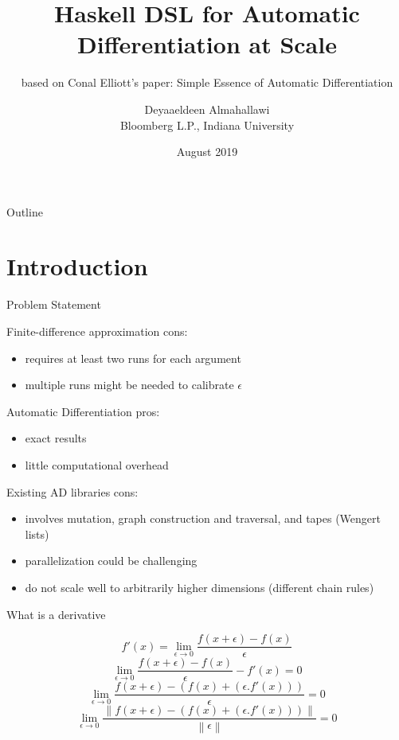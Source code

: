 \documentclass[12pt]{beamer}
\title{Haskell DSL for Automatic Differentiation at Scale}
\subtitle{based on Conal Elliott's paper: Simple Essence of Automatic Differentiation}
\author{Deyaaeldeen Almahallawi\\
  Bloomberg L.P., Indiana University}
\date{August 2019}
\begin{document}
\begin{frame}
\maketitle
\end{frame}

\begin{frame}{Outline}
\tableofcontents
\end{frame}

\section{Introduction}

\begin{frame}{Problem Statement}

Finite-difference approximation cons:
\begin{itemize}
\item requires at least two runs for each argument
\item multiple runs might be needed to calibrate $\epsilon$
\end{itemize}
\pause
Automatic Differentiation pros:
\begin{itemize}
\item exact results
\item little computational overhead
\end{itemize}
\pause
Existing AD libraries cons:
\begin{itemize}
\item involves mutation, graph construction and traversal, and tapes
  (Wengert lists)
\item parallelization could be challenging
\item do not scale well to arbitrarily higher dimensions (different
  chain rules)
\end{itemize}
\end{frame}

\begin{frame}{What is a derivative}

\begin{equation*}
  f'(x)=\lim_{\epsilon \to 0} \frac{f(x+\epsilon) - f(x)}{\epsilon}
\end{equation*}
\pause
\begin{equation*}
  \lim_{\epsilon \to 0} \frac{f(x+\epsilon) - f(x)}{\epsilon}-f'(x)=0
\end{equation*}
\pause
\begin{equation*}
  \lim_{\epsilon \to 0} \frac{f(x+\epsilon) - (f(x) + (\epsilon . f'(x)))}{\epsilon}=0
\end{equation*}
\pause
\begin{equation*}
  \lim_{\epsilon \to 0} \frac{\left\|f(x+\epsilon) - (f(x) + (\epsilon . f'(x)))\right\|}{\left\|\epsilon\right\|}=0
\end{equation*}
\end{frame}
\end{document}
